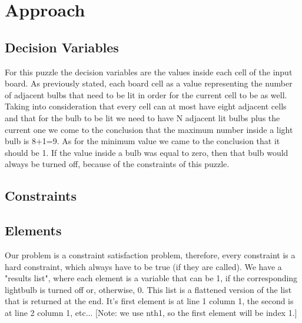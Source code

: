 \documentclass[runningheads]{llncs}
\begin{document}
\section{Approach}

\subsection{Decision Variables}
For this puzzle the decision variables are the values inside each cell of the input board. As previously stated, each board cell as a value representing the number of adjacent bulbs that need to be lit in order for the current cell to be as well.
Taking into consideration that every cell can at most have eight adjacent cells and that for the bulb to be lit we need to have N adjacent lit bulbs plus the current one we come to the conclusion that the maximum number inside a light bulb is 8+1=9. As for the minimum value we came to the conclusion that it should be 1. If the value inside a bulb was equal to zero, then that bulb would always be turned off, because of the constraints of this puzzle.

\subsection{Constraints}

\subsection{Elements}
Our problem is a constraint satisfaction problem, therefore, every constraint is a hard constraint, which always have to be true (if they are called).
We have a "results list", where each element is a variable that can be 1, if the corresponding lightbulb is turned off or, otherwise, 0. This list is a flattened version of the list that is returned at the end. It's first element is at line 1 column 1, the second is at line 2 column 1, etc...
[Note: we use nth1, so the first element will be index 1.]
\end{document}
